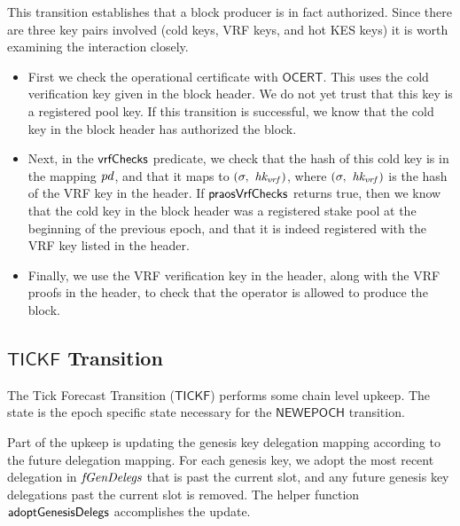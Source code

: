 This transition establishes that a block producer is in fact authorized.
Since there are three key pairs involved (cold keys, VRF keys, and hot KES keys)
it is worth examining the interaction closely.

\begin{itemize}
  \item First we check the operational certificate with $\mathsf{OCERT}$.
  This uses the cold verification key given in the block header.
  We do not yet trust that this key is a registered pool key.
  If this transition is successful, we know that the cold key in the block header has authorized
  the block.
\item  Next, in the $\mathsf{vrfChecks}$ predicate, we check that the hash of this cold key is in the
  mapping $\mathit{pd}$, and that it maps to $(\sigma,~\mathit{hk_{vrf}})$, where
  $(\sigma,~\mathit{hk_{vrf}})$ is the hash of the VRF key in the header.
  If $\mathsf{praosVrfChecks}$ returns true, then we know that the cold key in the block header was a
  registered stake pool at the beginning of the previous epoch, and that it is indeed registered
  with the VRF key listed in the header.
\item Finally, we use the VRF verification key in the header, along with the VRF proofs in the
  header, to check that the operator is allowed to produce the block.
\end{itemize}

\clearpage

\subsection{$\mathsf{TICKF}$ Transition}
\label{sec:tickf-trans}

The Tick Forecast Transition ($\mathsf{TICKF}$) performs some chain level
upkeep. The state is the epoch specific state necessary for the $\mathsf{NEWEPOCH}$ transition.

Part of the upkeep is updating the genesis key delegation mapping
according to the future delegation mapping.
For each genesis key, we adopt the most recent delegation in $\mathit{fGenDelegs}$
that is past the current slot, and any future genesis key delegations past the current
slot is removed. The helper function $\mathsf{adoptGenesisDelegs}$ accomplishes the update.

